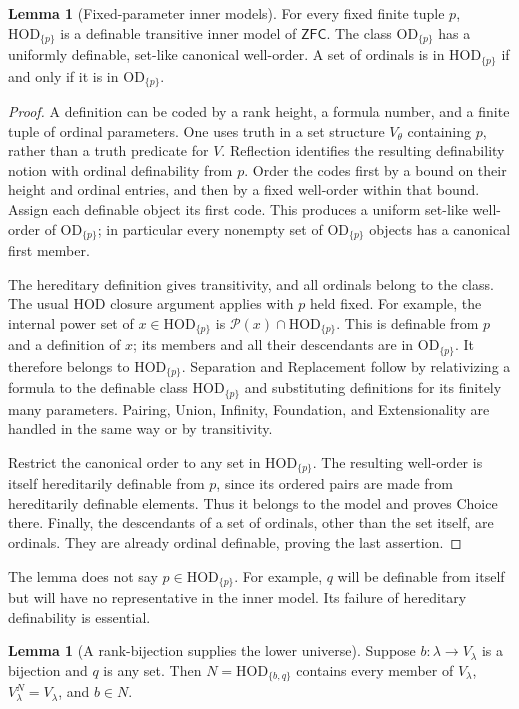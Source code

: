 \documentclass[11pt,letterpaper]{article}
\theoremstyle{definition}
\newtheorem{lemma}[definition]{Lemma}
\numberwithin{equation}{section}
\newcommand{\ZFC}{\mathsf{ZFC}}
\newcommand{\HOD}{\mathrm{HOD}}
\newcommand{\OD}{\mathrm{OD}}
\newcommand{\Pow}{\mathcal P}
\newcommand{\ODp}{\OD_{\{p\}}}
\newcommand{\HODp}{\HOD_{\{p\}}}
\begin{document}
\begin{lemma}[Fixed-parameter inner models]\label{lem:hod}
For every fixed finite tuple $p$, $\HODp$ is a definable transitive inner
model of $\ZFC$. The class $\ODp$ has a uniformly definable, set-like
canonical well-order. A set of ordinals is in $\HODp$ if and only if it is
in $\ODp$.
\end{lemma}

\begin{proof}
A definition can be coded by a rank height, a formula number, and a finite
tuple of ordinal parameters. One uses truth in a set structure
$V_\theta$ containing $p$, rather than a truth predicate for $V$.
Reflection identifies the resulting definability notion with ordinal
definability from $p$. Order the codes first by a bound on their height
and ordinal entries, and then by a fixed well-order within that bound.
Assign each definable object its first code. This produces a uniform
set-like well-order of $\ODp$; in particular every nonempty set of
$\ODp$ objects has a canonical first member.

The hereditary definition gives transitivity, and all ordinals belong
to the class. The usual HOD closure argument applies with $p$ held
fixed. For example, the internal power set of $x\in\HODp$ is
$\Pow(x)\cap\HODp$. This is definable from $p$ and a definition of $x$;
its members and all their descendants are in $\ODp$. It therefore
belongs to $\HODp$. Separation and Replacement follow by relativizing
a formula to the definable class $\HODp$ and substituting definitions
for its finitely many parameters. Pairing, Union, Infinity, Foundation,
and Extensionality are handled in the same way or by transitivity.

Restrict the canonical order to any set in $\HODp$. The resulting
well-order is itself hereditarily definable from $p$, since its ordered
pairs are made from hereditarily definable elements. Thus it belongs to
the model and proves Choice there. Finally, the descendants of a set
of ordinals, other than the set itself, are ordinals. They are already
ordinal definable, proving the last assertion.
\end{proof}

The lemma does not say $p\in\HODp$. For example, $q$ will be definable
from itself but will have no representative in the inner model. Its
failure of hereditary definability is essential.

\begin{lemma}[A rank-bijection supplies the lower universe]\label{lem:b-rank}
Suppose $b:\lambda\to V_\lambda$ is a bijection and $q$ is any set. Then
$N=\HOD_{\{b,q\}}$ contains every member of $V_\lambda$,
$V_\lambda^N=V_\lambda$, and $b\in N$.
\end{lemma}
\end{document}
